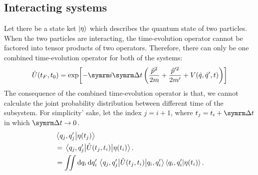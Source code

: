 \subsection{Interacting systems}

Let there be a state ket $\ket{\eta}$ which describes the quantum state of two particles. When the two particles are interacting, the time-evolution operator cannot be factored into tensor products of two operators. Therefore, there can only be one combined time-evolution operator for both of the systems:
\begin{equation}
    \hat{U}(t_F, t_0) = \exp[-\im\Dd{t}\left(\frac{\hat{p}^2}{2m} + \frac{\hat{p}'^2}{2m'} + V(\hat{q}, \hat{q}', t)\right)]
\end{equation}
The consequence of the combined time-evolution operator is that, we cannot calculate the joint probability distribution between different time of the subsystem. For simplicity’ sake, let the index $j = i + 1$, where $t_j = t_i + \Dd{t}$ in which $\Dd{t} \appr 0$.
\begin{align}
    &\braket{q_j, q_j'}{\eta(t_j)} \\
    &= \mel{q_j, q_j'}{\hat{U}(t_j, t_i)}{\eta(t_i)}. \\
    &= \iint \dd{q_i}\dd{q_i'} \mel{q_j, q_j'}{\hat{U}(t_j, t_i)}{q_i, q_i'}\braket{q_i, q_i'}{\eta(t_i)}.
\end{align}

